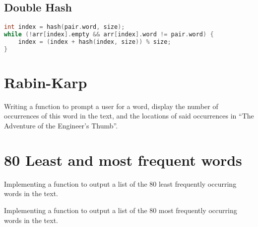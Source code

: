 \documentclass[12pt]{article}
\begin{document}
\subsection{Double Hash}
\begin{lstlisting}[language=C++]
int index = hash(pair.word, size);
while (!arr[index].empty && arr[index].word != pair.word) {
    index = (index + hash(index, size)) % size;
}
\end{lstlisting}

\section{Rabin-Karp}
Writing a function to prompt a user for a word, display the number of occurrences of this word in the
text, and the locations of said occurrences in “The Adventure of the Engineer’s Thumb”.

\section{80 Least and most frequent words}
Implementing a function to output a list of the 80 least frequently occurring words in the text.

Implementing a function to output a list of the 80 most frequently occurring words in the text.
\end{document}
